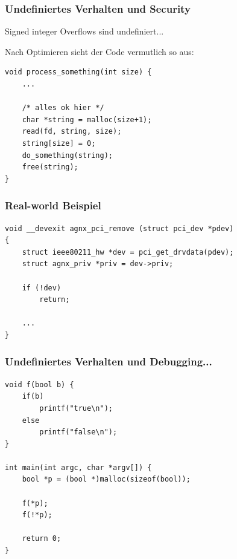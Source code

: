 \documentclass[12pt,compress]{beamer}
\begin{document}
\begin{frame}[fragile]
\frametitle{Undefiniertes Verhalten und Security}

Signed integer Overflows sind undefiniert...

\vfill

Nach Optimieren sieht der Code vermutlich so aus:

\vfill

\begin{lstlisting}
void process_something(int size) {
    ...

    /* alles ok hier */
    char *string = malloc(size+1);
    read(fd, string, size);
    string[size] = 0;
    do_something(string);
    free(string);
}
\end{lstlisting}
\end{frame}

\begin{frame}[fragile]
\frametitle{Real-world Beispiel}

\begin{lstlisting}
void __devexit agnx_pci_remove (struct pci_dev *pdev)
{
    struct ieee80211_hw *dev = pci_get_drvdata(pdev);
    struct agnx_priv *priv = dev->priv; 

    if (!dev)
        return;

    ...
}
\end{lstlisting}
\end{frame}



\begin{frame}[fragile]
\frametitle{Undefiniertes Verhalten und Debugging...}

\begin{lstlisting}
void f(bool b) {
    if(b)
        printf("true\n");
    else
        printf("false\n");
}

int main(int argc, char *argv[]) {
    bool *p = (bool *)malloc(sizeof(bool));

    f(*p);
    f(!*p);

    return 0;
}
\end{lstlisting}
\end{frame}
\end{document}
